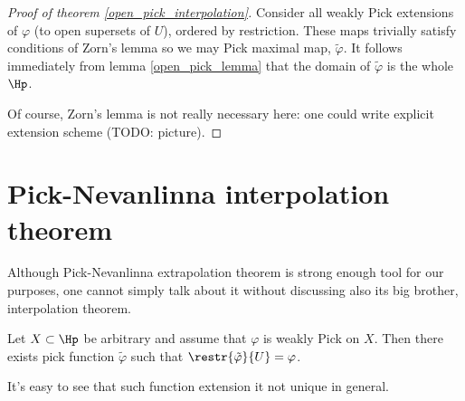 \begin{proof}[Proof of theorem \ref{open_pick_interpolation}]
	Consider all weakly Pick extensions of $\varphi$ (to open supersets of $U$), ordered by restriction. These maps trivially satisfy conditions of Zorn's lemma so we may Pick maximal map, $\tilde{\varphi}$. It follows immediately from lemma \ref{open_pick_lemma} that the domain of $\tilde{\varphi}$ is the whole $\Hp$.

	Of course, Zorn's lemma is not really necessary here: one could write explicit extension scheme (TODO: picture).
\end{proof}

\section{Pick-Nevanlinna interpolation theorem}

Although Pick-Nevanlinna extrapolation theorem is strong enough tool for our purposes, one cannot simply talk about it without discussing also its big brother, interpolation theorem.

\begin{lause}\label{pick_interpolation}
	Let $X \subset \Hp$ be arbitrary and assume that $\varphi$ is weakly Pick on $X$. Then there exists pick function $\tilde{\varphi}$ such that $\restr{\tilde{\varphi}}{U} = \varphi$.
\end{lause}

It's easy to see that such function extension it not unique in general.

